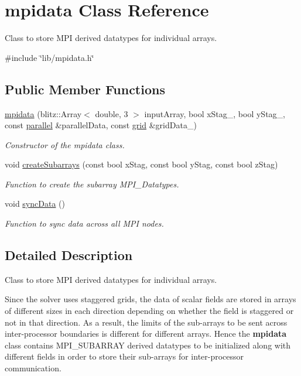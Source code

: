 \hypertarget{classmpidata}{}\section{mpidata Class Reference}
\label{classmpidata}


Class to store M\+PI derived datatypes for individual arrays.  




{\ttfamily \#include \char`\"{}lib/mpidata.\+h\char`\"{}}

\subsection*{Public Member Functions}
\begin{DoxyCompactItemize}
\item 
\hyperlink{classmpidata_adc5f562bf45ae213dded9c03f7d5195b}{mpidata} (blitz\+::\+Array$<$ double, 3 $>$ input\+Array, bool x\+Stag\+\_\+, bool y\+Stag\+\_\+, const \hyperlink{classparallel}{parallel} \&parallel\+Data, const \hyperlink{classgrid}{grid} \&grid\+Data\+\_\+)
\begin{DoxyCompactList}\small\item\em Constructor of the mpidata class. \end{DoxyCompactList}\item 
void \hyperlink{classmpidata_aebe34d26110d4efa596e8b836de09bf1}{create\+Subarrays} (const bool x\+Stag, const bool y\+Stag, const bool z\+Stag)
\begin{DoxyCompactList}\small\item\em Function to create the subarray M\+P\+I\+\_\+\+Datatypes. \end{DoxyCompactList}\item 
void \hyperlink{classmpidata_a8c722bece264a65a06c1843ab0ae9ae3}{sync\+Data} ()
\begin{DoxyCompactList}\small\item\em Function to sync data across all M\+PI nodes. \end{DoxyCompactList}\end{DoxyCompactItemize}


\subsection{Detailed Description}
Class to store M\+PI derived datatypes for individual arrays. 

Since the solver uses staggered grids, the data of scalar fields are stored in arrays of different sizes in each direction depending on whether the field is staggered or not in that direction. As a result, the limits of the sub-\/arrays to be sent across inter-\/processor boundaries is different for different arrays. Hence the {\bfseries mpidata} class contains M\+P\+I\+\_\+\+S\+U\+B\+A\+R\+R\+AY derived datatypes to be initialized along with different fields in order to store their sub-\/arrays for inter-\/processor communication. 

